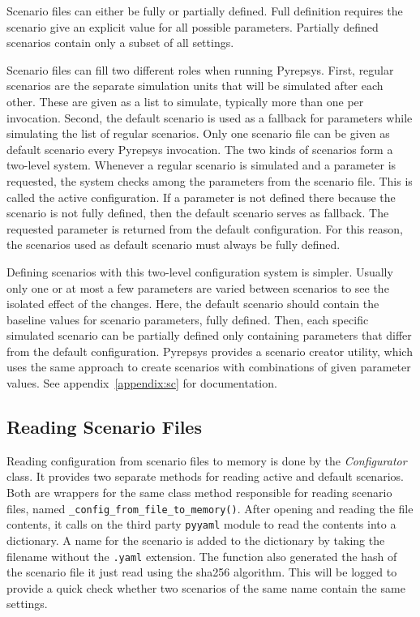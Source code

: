 \documentclass[%
    ]{\PathToTumTemplate/thesis/tum_thesis}
\begin{document}
Scenario files can either be fully or partially defined.
Full definition requires the scenario give an explicit value for all possible parameters.
Partially defined scenarios contain only a subset of all settings.

Scenario files can fill two different roles when running Pyrepsys.
First, regular scenarios are the separate simulation units that will be simulated after each other.
These are given as a list to simulate, typically more than one per invocation.
Second, the default scenario is used as a fallback for parameters while simulating the list of regular scenarios.
Only one scenario file can be given as default scenario every Pyrepsys invocation.
The two kinds of scenarios form a two-level system.
Whenever a regular scenario is simulated and a parameter is requested, the system checks among the parameters from the scenario file.
This is called the active configuration.
If a parameter is not defined there because the scenario is not fully defined, then the default scenario serves as fallback.
The requested parameter is returned from the default configuration.
For this reason, the scenarios used as default scenario must always be fully defined.

Defining scenarios with this two-level configuration system is simpler.
Usually only one or at most a few parameters are varied between scenarios to see the isolated effect of the changes.
Here, the default scenario should contain the baseline values for scenario parameters, fully defined.
Then, each specific simulated scenario can be partially defined only containing parameters that differ from the default configuration.
Pyrepsys provides a scenario creator utility, which uses the same approach to create scenarios with combinations of given parameter values.
See appendix~\ref{appendix:sc} for documentation.

\subsection{Reading Scenario Files}
Reading configuration from scenario files to memory is done by the \emph{Configurator} class.
It provides two separate methods for reading active and default scenarios.
Both are wrappers for the same class method responsible for reading scenario files, named \lstinline{_config_from_file_to_memory()}.
After opening and reading the file contents, it calls on the third party \texttt{pyyaml} module to read the contents into a dictionary.
A name for the scenario is added to the dictionary by taking the filename without the \texttt{.yaml} extension.
The function also generated the hash of the scenario file it just read using the sha256 algorithm.
This will be logged to provide a quick check whether two scenarios of the same name contain the same settings.
\end{document}
